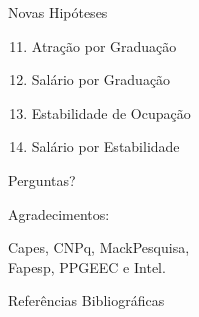 \documentclass[10pt, hyperref={pdfpagelabels=false}]{beamer}
\begin{document}
\begin{frame}[label=hipoteses-novas]{Novas Hipóteses}
  \begin{enumerate}
    \setcounter{enumi}{10}
    \item Atração por Graduação
    \item Salário por Graduação
    \item Estabilidade de Ocupação
    \item Salário por Estabilidade
  \end{enumerate}
\end{frame}

{
\begin{frame}[standout]
  \Large
  Perguntas?
  
  \normalsize
  \vspace{2\baselineskip}
  Agradecimentos:
  
  \vspace{0.5\baselineskip}
  Capes, CNPq, MackPesquisa,\\
   Fapesp, PPGEEC e Intel.
\end{frame}
}

\appendix

\begin{frame}[allowframebreaks]{Referências Bibliográficas}

  
  

\end{frame}
\end{document}
